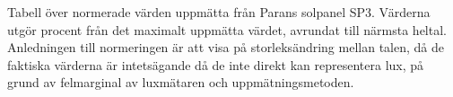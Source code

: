 Tabell över normerade värden uppmätta från Parans solpanel SP3. Värderna utgör procent från det maximalt uppmätta värdet, avrundat till närmsta heltal. Anledningen till normeringen är att  visa på storleksändring mellan talen, då de faktiska värderna är intetsägande då de inte direkt kan representera lux, på grund av felmarginal av luxmätaren och uppmätningsmetoden.
% 